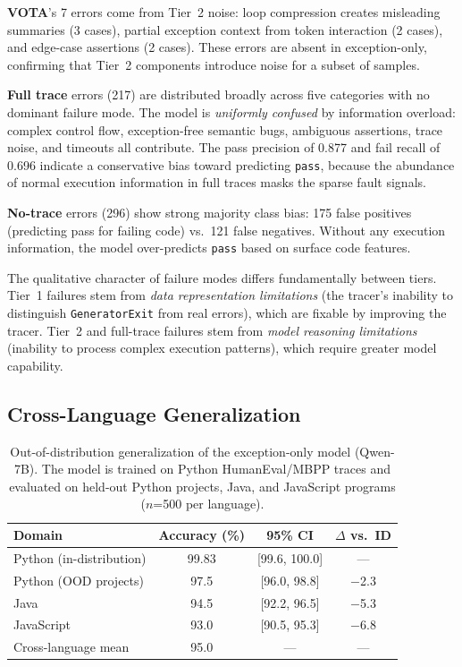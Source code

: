 \documentclass[11pt]{article}
\begin{document}
\textbf{VOTA}'s 7 errors come from Tier~2 noise: loop compression creates misleading summaries (3 cases), partial exception context from token interaction (2 cases), and edge-case assertions (2 cases). These errors are absent in exception-only, confirming that Tier~2 components introduce noise for a subset of samples.

\textbf{Full trace} errors (217) are distributed broadly across five categories with no dominant failure mode. The model is \emph{uniformly confused} by information overload: complex control flow, exception-free semantic bugs, ambiguous assertions, trace noise, and timeouts all contribute. The pass precision of 0.877 and fail recall of 0.696 indicate a conservative bias toward predicting \texttt{pass}, because the abundance of normal execution information in full traces masks the sparse fault signals.

\textbf{No-trace} errors (296) show strong majority class bias: 175 false positives (predicting pass for failing code) vs.\ 121 false negatives. Without any execution information, the model over-predicts \texttt{pass} based on surface code features.

The qualitative character of failure modes differs fundamentally between tiers. Tier~1 failures stem from \emph{data representation limitations} (the tracer's inability to distinguish \texttt{GeneratorExit} from real errors), which are fixable by improving the tracer. Tier~2 and full-trace failures stem from \emph{model reasoning limitations} (inability to process complex execution patterns), which require greater model capability.

\subsection{Cross-Language Generalization}
\label{sec:ood}

\begin{table}[t]
\centering
\caption{Out-of-distribution generalization of the exception-only model (Qwen-7B). The model is trained on Python HumanEval/MBPP traces and evaluated on held-out Python projects, Java, and JavaScript programs ($n$=500 per language).}
\label{tab:ood}
\small
\begin{tabular}{lccc}
\toprule
\textbf{Domain} & \textbf{Accuracy (\%)} & \textbf{95\% CI} & \textbf{$\Delta$ vs.\ ID} \\
\midrule
Python (in-distribution) & 99.83 & [99.6, 100.0] & --- \\
Python (OOD projects) & 97.5 & [96.0, 98.8] & $-$2.3 \\
Java & 94.5 & [92.2, 96.5] & $-$5.3 \\
JavaScript & 93.0 & [90.5, 95.3] & $-$6.8 \\
\midrule
Cross-language mean & 95.0 & --- & --- \\
\bottomrule
\end{tabular}
\end{table}
\end{document}
